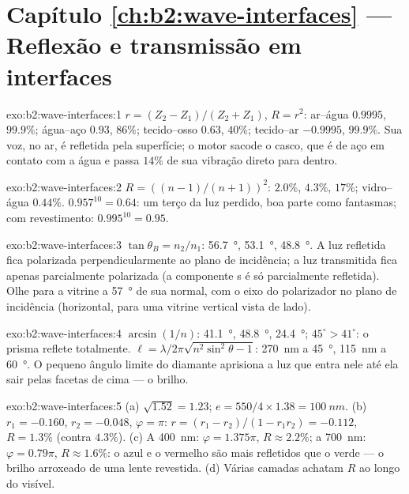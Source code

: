 \section*{Capítulo \ref{ch:b2:wave-interfaces} --- Reflexão e transmissão em interfaces}

\begin{solution}{exo:b2:wave-interfaces:1}
$r = (Z_2 - Z_1)/(Z_2 + Z_1)$, $R = r^2$: ar--água $0.9995$, $99.9\%$;
água--aço $0.93$, $86\%$; tecido--osso $0.63$, $40\%$; tecido--ar
$-0.9995$, $99.9\%$. Sua voz, no ar, é refletida pela superfície; o
motor sacode o casco, que é de aço em contato com a água e
passa $14\%$ de sua vibração direto para dentro.
\end{solution}

\begin{solution}{exo:b2:wave-interfaces:2}
$R = ((n - 1)/(n + 1))^2$: $2.0\%$, $4.3\%$, $17\%$; vidro--água $0.44\%$.
$0.957^{10} = 0.64$: um terço da luz perdido, boa parte como fantasmas;
com revestimento: $0.995^{10} = 0.95$.
\end{solution}

\begin{solution}{exo:b2:wave-interfaces:3}
$\tan\theta_B = n_2/n_1$: \qty{56.7}{\degree}, \qty{53.1}{\degree}, \qty{48.8}{\degree}. A
luz refletida fica polarizada perpendicularmente ao plano de incidência;
a luz transmitida fica apenas parcialmente polarizada (a componente s é
só parcialmente refletida). Olhe para a vitrine a \qty{57}{\degree} de sua
normal, com o eixo do polarizador no plano de incidência (horizontal,
para uma vitrine vertical vista de lado).
\end{solution}

\begin{solution}{exo:b2:wave-interfaces:4}
$\arcsin(1/n)$: \qty{41.1}{\degree}, \qty{48.8}{\degree}, \qty{24.4}{\degree}; $45^\circ > 41^\circ$:
o prisma reflete totalmente. $\ell = \lambda/2\pi\sqrt{n^2\sin^2\theta - 1}$: \qty{270}{nm}
a \qty{45}{\degree}, \qty{115}{nm} a \qty{60}{\degree}. O pequeno ângulo limite do diamante
aprisiona a luz que entra nele até ela sair pelas facetas de cima ---
o brilho.
\end{solution}

\begin{solution}{exo:b2:wave-interfaces:5}
(a) $\sqrt{1.52} = 1.23$; $e = 550/4 \times 1.38 = \qty{100}{nm}$. (b) $r_1 = -0.160$, $r_2 =
-0.048$, $\varphi = \pi$: $r = (r_1 - r_2)/(1 - r_1r_2) = -0.112$, $R = 1.3\%$ (contra
$4.3\%$). (c) A \qty{400}{nm}: $\varphi = 1.375\pi$, $R \approx 2.2\%$; a \qty{700}{nm}: $\varphi =
0.79\pi$, $R \approx 1.6\%$: o azul e o vermelho são mais refletidos que o verde ---
o brilho arroxeado de uma lente revestida. (d) Várias camadas achatam $R$
ao longo do visível.
\end{solution}

